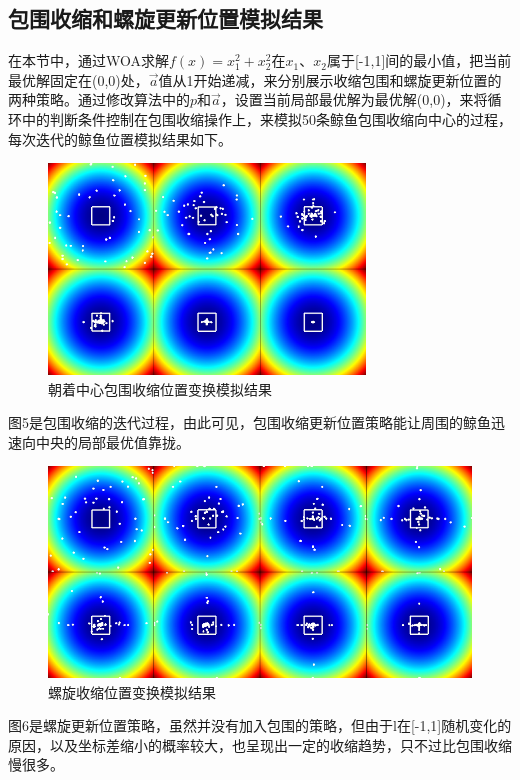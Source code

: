 \documentclass[12pt,a4paper]{article}
\begin{document}
\subsection{包围收缩和螺旋更新位置模拟结果}
在本节中，通过WOA求解$f(x)=x_1^2+x_2^2$在$x_1$、$x_2$属于[-1,1]间的最小值，把当前最优解固定在(0,0)处，$\vec{a}$值从1开始递减，来分别展示收缩包围和螺旋更新位置的两种策略。通过修改算法中的$p$和$\vec{a}$，设置当前局部最优解为最优解(0,0)，来将循环中的判断条件控制在包围收缩操作上，来模拟50条鲸鱼包围收缩向中心的过程，每次迭代的鲸鱼位置模拟结果如下。
\begin{figure}[H]
\centering
\includegraphics[width=0.75\textwidth]{figure/a.png}
\renewcommand\figurename{图}\caption{朝着中心包围收缩位置变换模拟结果}
\end{figure}

图5是包围收缩的迭代过程，由此可见，包围收缩更新位置策略能让周围的鲸鱼迅速向中央的局部最优值靠拢。
\begin{figure}[H]
\centering
\includegraphics[width=1.0\textwidth]{figure/b.png}
\renewcommand\figurename{图}\caption{螺旋收缩位置变换模拟结果}
\end{figure}

图6是螺旋更新位置策略，虽然并没有加入包围的策略，但由于l在[-1,1]随机变化的原因，以及坐标差缩小的概率较大，也呈现出一定的收缩趋势，只不过比包围收缩慢很多。
\end{document}
